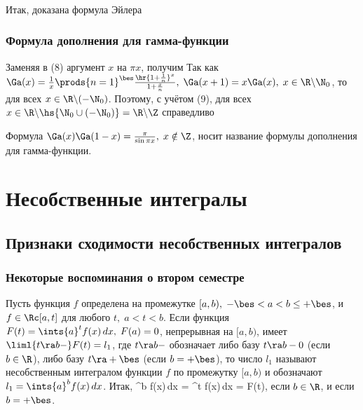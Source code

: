 \documentclass[a4paper]{article}
\begin{document}
\subsubsection{}

Итак, доказана формула Эйлера 

\subsubsection{Формула дополнения для гамма-функции}

Заменяя в (8) аргумент $x$ на $\pi x$, получим  Так
как $\Ga(x) = \frac1x \prods{n=1}^{\bes}
\frac{\hr{1+\frac1n}^x}{1+\frac{x}n}, \; \Ga(x+1) = x\Ga(x), \;
x\in\R\backslash \N_0$, то  для всех
$x\in\R\backslash (-\N_0)$. Поэтому, с учётом (9), для всех $x\in
\R\backslash \hs{\N_0 \cup (-\N_0)} = \R\backslash\Z$ справедливо

Формула $\Ga(x)\Ga(1-x) = \frac{\pi}{\sin\pi x}, \; x\notin\Z$,
носит название формулы дополнения для гамма-функции.

\section{Несобственные интегралы}

\subsection{Признаки сходимости несобственных интегралов}

\subsubsection{Некоторые воспоминания о втором семестре}

Пусть функция $f$ определена на промежутке $[a,b), \; -\bes < a < b
\le + \bes$, и $f\in\Rc[a,t]$ для любого $t, \; a<t<b$. Если функция
$F(t) = \ints{a}^t f(x)\,dx, \; F(a)=0$, непрерывная на $[a,b)$,
имеет $\liml{t\ra b-} F(t) = l_1$, где $t\ra b-$ обозначает либо
базу $t\ra b-0$ (если $b\in\R$), либо базу $t\ra +\bes$ (если
$b=+\bes$), то число $l_1$ называют несобственным интегралом функции
$f$ по промежутку $[a,b)$ и обозначают $l_1 = \ints{a}^b f(x)\,dx$.
Итак,  {^b f(x)\,dx =  ^t
f(x)\,dx =  F(t),} если $b\in\R$, и
 если $b=+\bes$.
\end{document}
